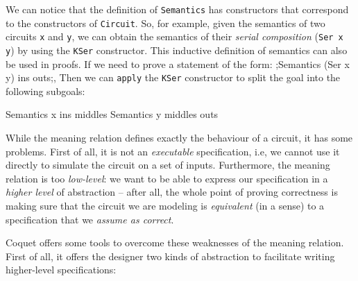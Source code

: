             We can notice that the definition of \texttt{Semantics} has constructors that correspond
            to the constructors of \texttt{Circuit}. So, for example, given the semantics of two
            circuits \texttt{x} and \texttt{y}, we can obtain the semantics of their \emph{serial
                composition} (\texttt{Ser x y}) by using the \texttt{KSer} constructor. This
            inductive definition of semantics can also be used in proofs. If we need to prove a
            statement of the form: \coq;Semantics (Ser x y) ins outs;, Then we can \texttt{apply} the
            \texttt{KSer} constructor to split the goal into the following subgoals:

            \begin{coqcode}
        Semantics x ins middles
        Semantics y middles outs
            \end{coqcode}

            While the meaning relation defines exactly the behaviour of a circuit, it has some
            problems. First of all, it is not an \emph{executable} specification, i.e, we cannot use
            it directly to simulate the circuit on a set of inputs. Furthermore, the meaning
            relation is too \emph{low-level}: we want to be able to express our specification in a
            \emph{higher level} of abstraction -- after all, the whole point of proving correctness
            is making sure that the circuit we are modeling is \emph{equivalent} (in a sense) to a
            specification that we \emph{assume as correct}.

            Coquet offers some tools to overcome these weaknesses of the meaning relation. First of
            all, it offers the designer two kinds of abstraction to facilitate writing higher-level
            specifications:

